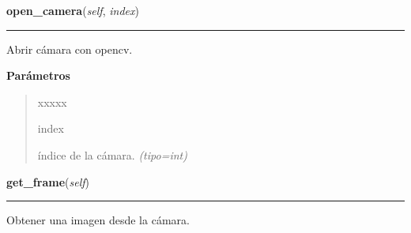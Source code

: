 \hspace{.8\funcindent}\begin{boxedminipage}{\funcwidth}

    \raggedright \textbf{open\_camera}(\textit{self}, \textit{index})

    \vspace{-1.5ex}

    \rule{\textwidth}{0.5\fboxrule}
\setlength{\parskip}{2ex}
Abrir cámara con opencv.

\setlength{\parskip}{1ex}
      \textbf{Parámetros}
      \vspace{-1ex}

      \begin{quote}
        \begin{Ventry}{xxxxx}

          \item[index]


índice de la cámara.
            {\it (tipo=int)}

        \end{Ventry}

      \end{quote}

    \end{boxedminipage}

    \label{src:camera:Camera:get_frame}

    \vspace{0.5ex}

\hspace{.8\funcindent}\begin{boxedminipage}{\funcwidth}

    \raggedright \textbf{get\_frame}(\textit{self})

    \vspace{-1.5ex}

    \rule{\textwidth}{0.5\fboxrule}
\setlength{\parskip}{2ex}
Obtener una imagen desde la cámara.

\setlength{\parskip}{1ex}
    \end{boxedminipage}

    \label{src:camera:Camera:is_open}

    \vspace{0.5ex}

